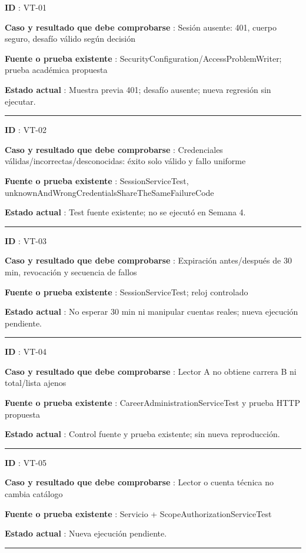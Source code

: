 \documentclass[12pt,a4paper]{report}
\begin{document}
\textbf{ID }: VT-01

\textbf{Caso y resultado que debe comprobarse }: Sesión ausente: 401,
cuerpo seguro, desafío válido según decisión

\textbf{Fuente o prueba existente
}: SecurityConfiguration/AccessProblemWriter; prueba académica propuesta

\textbf{Estado actual }: Muestra previa 401; desafío ausente; nueva
regresión sin ejecutar.

\medskip\hrule\medskip

\textbf{ID }: VT-02

\textbf{Caso y resultado que debe comprobarse }: Credenciales
válidas/incorrectas/desconocidas: éxito solo válido y fallo uniforme

\textbf{Fuente o prueba existente }: SessionServiceTest,
unknownAndWrongCredentialsShareTheSameFailureCode

\textbf{Estado actual }: Test fuente existente; no se ejecutó en Semana
4.

\medskip\hrule\medskip

\textbf{ID }: VT-03

\textbf{Caso y resultado que debe comprobarse }: Expiración
antes/después de 30 min, revocación y secuencia de fallos

\textbf{Fuente o prueba existente }: SessionServiceTest; reloj
controlado

\textbf{Estado actual }: No esperar 30 min ni manipular cuentas reales;
nueva ejecución pendiente.

\medskip\hrule\medskip

\textbf{ID }: VT-04

\textbf{Caso y resultado que debe comprobarse }: Lector A no obtiene
carrera B ni total/lista ajenos

\textbf{Fuente o prueba existente }: CareerAdministrationServiceTest y
prueba HTTP propuesta

\textbf{Estado actual }: Control fuente y prueba existente; sin nueva
reproducción.

\medskip\hrule\medskip

\textbf{ID }: VT-05

\textbf{Caso y resultado que debe comprobarse }: Lector o cuenta técnica
no cambia catálogo

\textbf{Fuente o prueba existente }: Servicio +
ScopeAuthorizationServiceTest

\textbf{Estado actual }: Nueva ejecución pendiente.

\medskip\hrule\medskip
\end{document}
